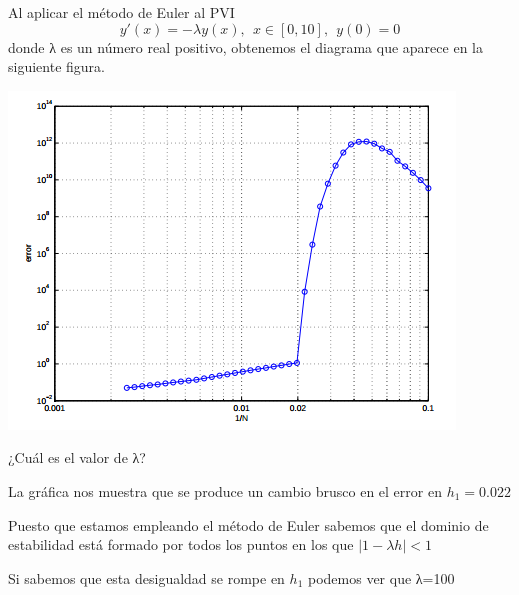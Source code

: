 \begin{problem}[4]
Al aplicar el método de Euler al PVI
\[y'(x) = -λy(x), \ \ x \in [0,10], \ \ y(0)=0\]
donde λ es un número real positivo, obtenemos el diagrama que aparece en la siguiente figura.

\begin{center}
\includegraphics[width=0.8\linewidth]{img/figura_enunciado1.png}
\end{center}

¿Cuál es el valor de λ?

\solution

La gráfica nos muestra que se produce un cambio brusco en el error en $h_1=0.022$

Puesto que estamos empleando el método de Euler sabemos que el dominio de estabilidad está formado por todos los puntos en los que $|1-λh|<1$

Si sabemos que esta desigualdad se rompe en $h_1$ podemos ver que λ=100

\end{problem}


